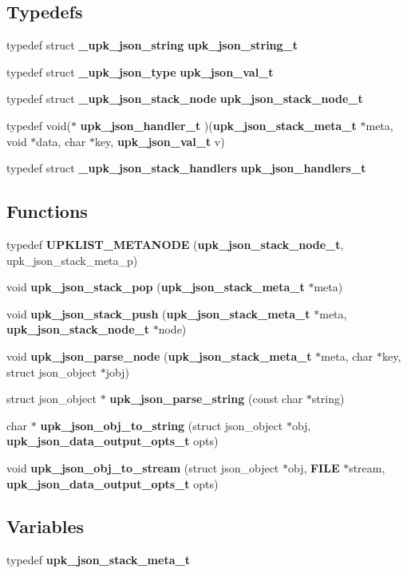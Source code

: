\subsection*{Typedefs}
\begin{DoxyCompactItemize}
\item 
typedef struct {\bf \_\-upk\_\-json\_\-string} {\bf upk\_\-json\_\-string\_\-t}
\item 
typedef struct {\bf \_\-upk\_\-json\_\-type} {\bf upk\_\-json\_\-val\_\-t}
\item 
typedef struct {\bf \_\-upk\_\-json\_\-stack\_\-node} {\bf upk\_\-json\_\-stack\_\-node\_\-t}
\item 
typedef void($\ast$ {\bf upk\_\-json\_\-handler\_\-t} )({\bf upk\_\-json\_\-stack\_\-meta\_\-t} $\ast$meta, void $\ast$data, char $\ast$key, {\bf upk\_\-json\_\-val\_\-t} v)
\item 
typedef struct {\bf \_\-upk\_\-json\_\-stack\_\-handlers} {\bf upk\_\-json\_\-handlers\_\-t}
\end{DoxyCompactItemize}
\subsection*{Functions}
\begin{DoxyCompactItemize}
\item 
typedef {\bf UPKLIST\_\-METANODE} ({\bf upk\_\-json\_\-stack\_\-node\_\-t}, upk\_\-json\_\-stack\_\-meta\_\-p)
\item 
void {\bf upk\_\-json\_\-stack\_\-pop} ({\bf upk\_\-json\_\-stack\_\-meta\_\-t} $\ast$meta)
\item 
void {\bf upk\_\-json\_\-stack\_\-push} ({\bf upk\_\-json\_\-stack\_\-meta\_\-t} $\ast$meta, {\bf upk\_\-json\_\-stack\_\-node\_\-t} $\ast$node)
\item 
void {\bf upk\_\-json\_\-parse\_\-node} ({\bf upk\_\-json\_\-stack\_\-meta\_\-t} $\ast$meta, char $\ast$key, struct json\_\-object $\ast$jobj)
\item 
struct json\_\-object $\ast$ {\bf upk\_\-json\_\-parse\_\-string} (const char $\ast$string)
\item 
char $\ast$ {\bf upk\_\-json\_\-obj\_\-to\_\-string} (struct json\_\-object $\ast$obj, {\bf upk\_\-json\_\-data\_\-output\_\-opts\_\-t} opts)
\item 
void {\bf upk\_\-json\_\-obj\_\-to\_\-stream} (struct json\_\-object $\ast$obj, {\bf FILE} $\ast$stream, {\bf upk\_\-json\_\-data\_\-output\_\-opts\_\-t} opts)
\end{DoxyCompactItemize}
\subsection*{Variables}
\begin{DoxyCompactItemize}
\item 
typedef {\bf upk\_\-json\_\-stack\_\-meta\_\-t}
\end{DoxyCompactItemize}


